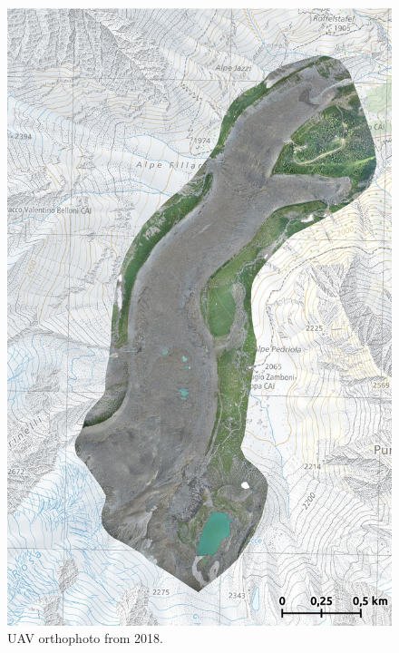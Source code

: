 \begin{figure}[p]
    \centering
    \includegraphics[height=\textheight]{figures/appendix/orto_2018.jpg}
    \caption{UAV orthophoto from 2018.}
\end{figure}

